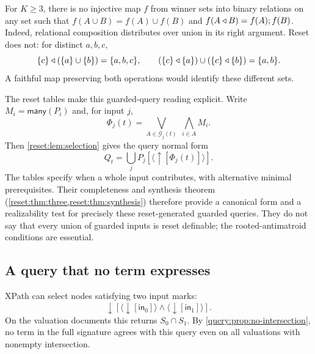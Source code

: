 \begin{remark}\label{query:prop:no-reset-product}
For $K\geq3$, there is no injective map $f$ from winner sets into binary
relations on any set such that
$f(A\cup B)=f(A)\cup f(B)$ and $f(A\mathbin{\triangleleft} B)=f(A);f(B)$.
Indeed, relational composition distributes over union in its right argument.
Reset does not: for distinct $a,b,c$,
\[
 \{c\}\mathbin{\triangleleft}(\{a\}\cup\{b\})=\{a,b,c\},\qquad
 (\{c\}\mathbin{\triangleleft}\{a\})\cup(\{c\}\mathbin{\triangleleft}\{b\})=\{a,b\}.
\]
A faithful map preserving both operations would identify these different
sets.
\end{remark}

The reset tables make this guarded-query reading explicit. Write
$M_i=\mathsf{many}(P_i)$ and, for input $j$,
\[
 \Phi_j(t)=\bigvee_{A\in\mathcal G_j(t)}\;\bigwedge_{i\in A}M_i.
\]
Then \cref{reset:lem:selection} gives the query normal form
\[
 Q_t=\bigcup_j P_j[\langle\uparrow[\Phi_j(t)]\rangle].
\]
The tables specify when a whole input contributes, with alternative
minimal prerequisites. Their completeness and synthesis theorem
(\cref{reset:thm:three,reset:thm:synthesis}) therefore provide a canonical
form and a realizability test for precisely these reset-generated
guarded queries. They do not say that every union of guarded inputs is
reset definable; the rooted-antimatroid conditions are essential.

\subsection{A query that no term expresses}

XPath can select nodes satisfying two input marks:
\[
 \downarrow[\langle\downarrow[\mathsf{in}_0]\rangle
              \land\langle\downarrow[\mathsf{in}_1]\rangle].
\]
On the valuation documents this returns $S_0\cap S_1$.
By \cref{query:prop:no-intersection}, no term in the full signature
agrees with this query even on all valuations with nonempty intersection.
